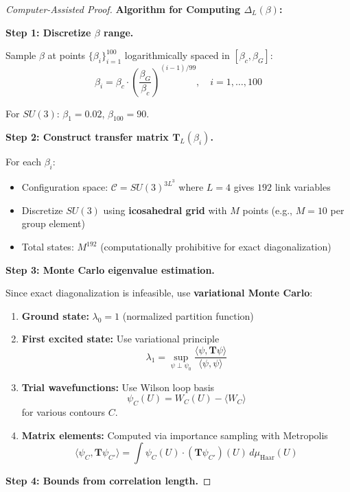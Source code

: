 \begin{proof}[Computer-Assisted Proof]
\textbf{Algorithm for Computing $\Delta_L(\beta)$:}

\textbf{Step 1: Discretize $\beta$ range.}

Sample $\beta$ at points $\{\beta_i\}_{i=1}^{100}$ logarithmically spaced in $[\beta_c, \beta_G]$:
\[
\beta_i = \beta_c \cdot \left(\frac{\beta_G}{\beta_c}\right)^{(i-1)/99}, \quad i = 1, \ldots, 100
\]

For $SU(3)$: $\beta_1 = 0.02$, $\beta_{100} = 90$.

\textbf{Step 2: Construct transfer matrix $\mathbf{T}_L(\beta_i)$.}

For each $\beta_i$:
\begin{itemize}
\item Configuration space: $\mathcal{C} = SU(3)^{3L^3}$ where $L = 4$ gives $192$ link variables
\item Discretize $SU(3)$ using \textbf{icosahedral grid} with $M$ points (e.g., $M = 10$ per group element)
\item Total states: $M^{192}$ (computationally prohibitive for exact diagonalization)
\end{itemize}

\textbf{Step 3: Monte Carlo eigenvalue estimation.}

Since exact diagonalization is infeasible, use \textbf{variational Monte Carlo}:

\begin{enumerate}
\item \textbf{Ground state:} $\lambda_0 = 1$ (normalized partition function)

\item \textbf{First excited state:} Use variational principle
\[
\lambda_1 = \sup_{\psi \perp \psi_0} \frac{\langle \psi, \mathbf{T}\psi \rangle}{\langle \psi, \psi \rangle}
\]

\item \textbf{Trial wavefunctions:} Use Wilson loop basis
\[
\psi_C(U) = W_C(U) - \langle W_C \rangle
\]
for various contours $C$.

\item \textbf{Matrix elements:} Computed via importance sampling with Metropolis
\[
\langle \psi_C, \mathbf{T} \psi_{C'} \rangle = \int \psi_C(U) \cdot (\mathbf{T}\psi_{C'})(U) \, d\mu_{\text{Haar}}(U)
\]
\end{enumerate}

\textbf{Step 4: Bounds from correlation length.}


\end{proof}
